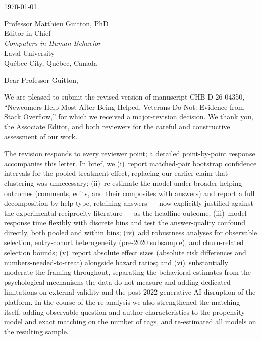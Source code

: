 \documentclass[12pt]{article}
\begin{document}
\noindent \today %

\vspace{1em}

\noindent Professor Matthieu Guitton, PhD\\
Editor-in-Chief\\
\textit{Computers in Human Behavior}\\
Laval University\\
Qu\'{e}bec City, Qu\'{e}bec, Canada

\vspace{1em}

\noindent Dear Professor Guitton,

\vspace{0.5em}

\noindent We are pleased to submit the revised version of manuscript CHB-D-26-04350, ``Newcomers Help Most After Being Helped, Veterans Do Not: Evidence from Stack Overflow,'' for which we received a major-revision decision. We thank you, the Associate Editor, and both reviewers for the careful and constructive assessment of our work.

\vspace{0.5em}

\noindent The revision responds to every reviewer point; a detailed point-by-point response accompanies this letter. In brief, we (i)~report matched-pair bootstrap confidence intervals for the pooled treatment effect, replacing our earlier claim that clustering was unnecessary; (ii)~re-estimate the model under broader helping outcomes (comments, edits, and their composites with answers) and report a full decomposition by help type, retaining answers --- now explicitly justified against the experimental reciprocity literature --- as the headline outcome; (iii)~model response time flexibly with discrete bins and test the answer-quality confound directly, both pooled and within bins; (iv)~add robustness analyses for observable selection, entry-cohort heterogeneity (pre-2020 subsample), and churn-related selection bounds; (v)~report absolute effect sizes (absolute risk differences and numbers-needed-to-treat) alongside hazard ratios; and (vi)~substantially moderate the framing throughout, separating the behavioral estimates from the psychological mechanisms the data do not measure and adding dedicated limitations on external validity and the post-2022 generative-AI disruption of the platform. In the course of the re-analysis we also strengthened the matching itself, adding observable question and author characteristics to the propensity model and exact matching on the number of tags, and re-estimated all models on the resulting sample.
\end{document}
